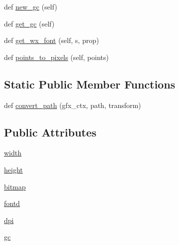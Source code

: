 \begin{DoxyCompactItemize}
\item 
def \hyperlink{classmatplotlib_1_1backends_1_1backend__wx_1_1RendererWx_a3b7fb04ea0934ebced409e00b9ecfba5}{new\+\_\+gc} (self)
\item 
def \hyperlink{classmatplotlib_1_1backends_1_1backend__wx_1_1RendererWx_a80cf2e9116c25ae7d618d01752c5f566}{get\+\_\+gc} (self)
\item 
def \hyperlink{classmatplotlib_1_1backends_1_1backend__wx_1_1RendererWx_a0990e8e2feacf2c80a5ea87217694770}{get\+\_\+wx\+\_\+font} (self, s, prop)
\item 
def \hyperlink{classmatplotlib_1_1backends_1_1backend__wx_1_1RendererWx_a579dcec10773b62ea8f042aab8bfc787}{points\+\_\+to\+\_\+pixels} (self, points)
\end{DoxyCompactItemize}
\subsection*{Static Public Member Functions}
\begin{DoxyCompactItemize}
\item 
def \hyperlink{classmatplotlib_1_1backends_1_1backend__wx_1_1RendererWx_ace72446e8e3869c30525e33c1aac65e4}{convert\+\_\+path} (gfx\+\_\+ctx, path, transform)
\end{DoxyCompactItemize}
\subsection*{Public Attributes}
\begin{DoxyCompactItemize}
\item 
\hyperlink{classmatplotlib_1_1backends_1_1backend__wx_1_1RendererWx_ade12cd0552dc96e33cea8d14b4831436}{width}
\item 
\hyperlink{classmatplotlib_1_1backends_1_1backend__wx_1_1RendererWx_a86c062816292391da71ee59c81377d70}{height}
\item 
\hyperlink{classmatplotlib_1_1backends_1_1backend__wx_1_1RendererWx_a2a92b59c7c2e67346511c018368bff71}{bitmap}
\item 
\hyperlink{classmatplotlib_1_1backends_1_1backend__wx_1_1RendererWx_aaf1681cf631f85514a56deea8c5063fb}{fontd}
\item 
\hyperlink{classmatplotlib_1_1backends_1_1backend__wx_1_1RendererWx_a5999c443d2163399de2bc9b9b4ebb433}{dpi}
\item 
\hyperlink{classmatplotlib_1_1backends_1_1backend__wx_1_1RendererWx_a130cbf80d305ddfe0710684785c2cea8}{gc}
\end{DoxyCompactItemize}
